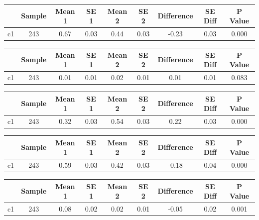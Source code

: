 {
\def\sym#1{\ifmmode^{#1}\else\(^{#1}\)\fi}
\begin{tabular}{l*{1}{cccccccc}}
\hline\hline
            &      Sample&      Mean 1&        SE 1&      Mean 2&        SE 2&  Difference&     SE Diff&     P Value\\
\hline
c1          &         243&        0.67&        0.03&        0.44&        0.03&       -0.23&        0.03&       0.000\\
\hline\hline
\end{tabular}
}
{
\def\sym#1{\ifmmode^{#1}\else\(^{#1}\)\fi}
\begin{tabular}{l*{1}{cccccccc}}
\hline\hline
            &      Sample&      Mean 1&        SE 1&      Mean 2&        SE 2&  Difference&     SE Diff&     P Value\\
\hline
c1          &         243&        0.01&        0.01&        0.02&        0.01&        0.01&        0.01&       0.083\\
\hline\hline
\end{tabular}
}
{
\def\sym#1{\ifmmode^{#1}\else\(^{#1}\)\fi}
\begin{tabular}{l*{1}{cccccccc}}
\hline\hline
            &      Sample&      Mean 1&        SE 1&      Mean 2&        SE 2&  Difference&     SE Diff&     P Value\\
\hline
c1          &         243&        0.32&        0.03&        0.54&        0.03&        0.22&        0.03&       0.000\\
\hline\hline
\end{tabular}
}
{
\def\sym#1{\ifmmode^{#1}\else\(^{#1}\)\fi}
\begin{tabular}{l*{1}{cccccccc}}
\hline\hline
            &      Sample&      Mean 1&        SE 1&      Mean 2&        SE 2&  Difference&     SE Diff&     P Value\\
\hline
c1          &         243&        0.59&        0.03&        0.42&        0.03&       -0.18&        0.04&       0.000\\
\hline\hline
\end{tabular}
}
{
\def\sym#1{\ifmmode^{#1}\else\(^{#1}\)\fi}
\begin{tabular}{l*{1}{cccccccc}}
\hline\hline
            &      Sample&      Mean 1&        SE 1&      Mean 2&        SE 2&  Difference&     SE Diff&     P Value\\
\hline
c1          &         243&        0.08&        0.02&        0.02&        0.01&       -0.05&        0.02&       0.001\\
\hline\hline
\end{tabular}
}

